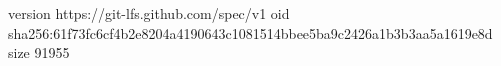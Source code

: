 version https://git-lfs.github.com/spec/v1
oid sha256:61f73fc6cf4b2e8204a4190643c1081514bbee5ba9c2426a1b3b3aa5a1619e8d
size 91955
